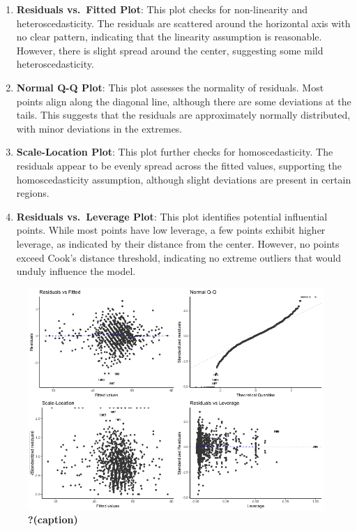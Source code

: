 \documentclass[
  letterpaper,
  DIV=11,
  numbers=noendperiod]{scrartcl}
\begin{document}
\begin{enumerate}
\def\labelenumi{\arabic{enumi}.}
\item
  \textbf{Residuals vs.~Fitted Plot}: This plot checks for non-linearity
  and heteroscedasticity. The residuals are scattered around the
  horizontal axis with no clear pattern, indicating that the linearity
  assumption is reasonable. However, there is slight spread around the
  center, suggesting some mild heteroscedasticity.
\item
  \textbf{Normal Q-Q Plot}: This plot assesses the normality of
  residuals. Most points align along the diagonal line, although there
  are some deviations at the tails. This suggests that the residuals are
  approximately normally distributed, with minor deviations in the
  extremes.
\item
  \textbf{Scale-Location Plot}: This plot further checks for
  homoscedasticity. The residuals appear to be evenly spread across the
  fitted values, supporting the homoscedasticity assumption, although
  slight deviations are present in certain regions.
\item
  \textbf{Residuals vs.~Leverage Plot}: This plot identifies potential
  influential points. While most points have low leverage, a few points
  exhibit higher leverage, as indicated by their distance from the
  center. However, no points exceed Cook's distance threshold,
  indicating no extreme outliers that would unduly influence the model.
\end{enumerate}

\begin{figure}

{\centering \includegraphics{../other/graphs/diagnostic_plot_model6.png}

}

\caption{\label{fig-dgplottwo}\textbf{?(caption)}}

\end{figure}
\end{document}
